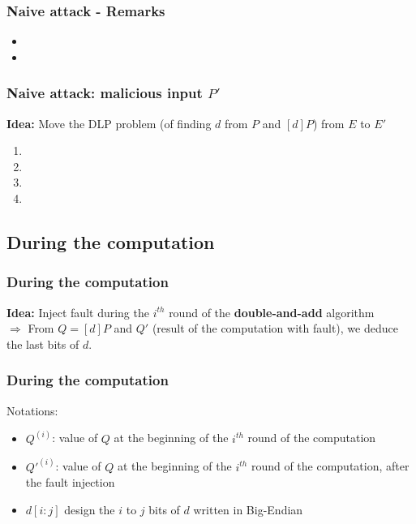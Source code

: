 \documentclass{beamer}
\begin{document}
    \begin{frame}
        \frametitle{Naive attack - Remarks}
            \begin{itemize} 
                \item \color{black}{Same with $P_1' \notin E(K) \Rightarrow$ result not in $E(K)$}
                \item \color{black}{Does not depend on $a_6 \Rightarrow$ same addition on $E'(K)$}
            \end{itemize}

    \end{frame}
    
    \begin{frame}
        \frametitle{Naive attack: malicious input $P'$}
        {\bf Idea:} Move the DLP problem (of finding $d$ from $P$ and $[d]P$) from $E$ to $E'$
        \begin{enumerate}
            \item \color{black}{Find $E'$ of equation $y^2 + a_1xy + a_3y = x^3 + a_2x^2 + a_4x + a'_6$ of cardinality with a small factor}
            \item \color{black}{Find $P' \in E'(K)$ of small order}
            \item {}
            \item \color{black}{Solve DLP in $<P'>$}
        \end{enumerate}
        
    \end{frame}
    
    \subsection{During the computation}
    \begin{frame}
        \frametitle{During the computation}
        {\bf Idea: } Inject fault during the $i^{th}$ round of the {\bf double-and-add} algorithm \\

        $\Rightarrow$ From $Q = [d]P$ and $Q'$ (result of the computation with fault), we deduce the last bits of $d$.

    \end{frame}
    
    \begin{frame}
        \frametitle{During the computation}
        Notations:
        \begin{itemize}
            \item $Q^{(i)}$: value of $Q$ at the beginning of the $i^{th}$ round of the computation
            \item $Q'^{(i)}$: value of $Q$ at the beginning of the $i^{th}$ round of the computation, after the fault injection
            \item $d[i:j]$ design the $i$ to $j$ bits of $d$ written in Big-Endian
        \end{itemize}

    \end{frame}
    
\end{document}
